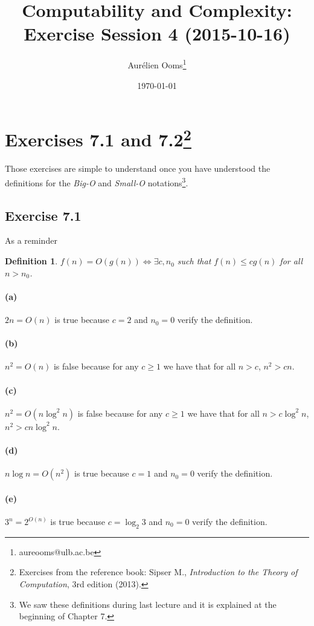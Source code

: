 \documentclass{article}
\title{Computability and Complexity:\\Exercise Session 4 (2015-10-16)}
\author{Aurélien Ooms\footnote{aureooms@ulb.ac.be}}
\date{\today}
\newcommand{\definitionname}{Definition}
\newtheorem{definition}{\definitionname}
\begin{document}
\maketitle
\tableofcontents

\section{Exercises 7.1 and 7.2\footnote{Exercises from the reference book: Sipser M.,
\emph{Introduction to the Theory of Computation}, 3rd edition (2013).}}
Those exercises are simple to understand once you have understood the definitions for the
\emph{Big-O} and \emph{Small-O} notations\footnote{We saw these definitions
during last lecture and it is explained at the beginning of Chapter 7.}.

\subsection{Exercise 7.1}
As a reminder
\begin{definition}
	\(f(n) = O(g(n)) \iff \exists c, n_0\) such that \(f(n) \le c g(n)\) for
	all \(n > n_0\).
\end{definition}

\paragraph{(a)}
\(2n = O(n)\)
is true because \(c = 2\) and \(n_0 = 0\) verify the definition.

\paragraph{(b)}
\(n^2 = O(n)\)
is false because for any \(c \ge 1\) we have that for all \(n > c\), \(n^2 > cn\).

\paragraph{(c)}
\(n^2 = O(n \log^2 n)\)
is false because for any \(c \ge 1\) we have that for all \(n > c \log^2 n\), \(n^2 > cn \log^2 n\).

\paragraph{(d)}
\(n \log n = O(n^2)\)
is true because \(c = 1\) and \(n_0 = 0\) verify the definition.

\paragraph{(e)}
\(3^n = 2^{O(n)}\)
is true because \(c = \log_2 3\) and \(n_0 = 0\) verify the definition.
\end{document}

